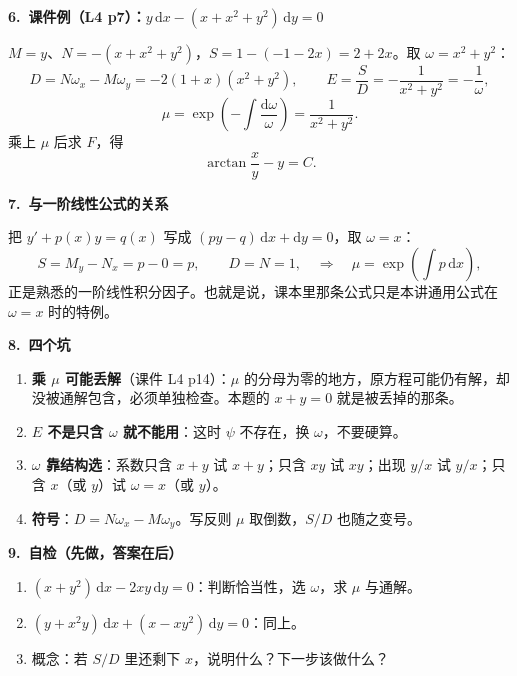 \documentclass[11pt,a4paper]{ctexart}
\newcommand{\dd}{\mathrm{d}}
\begin{document}
\textbf{6.\ 课件例（L4 p7）：$y\,\dd x-(x+x^{2}+y^{2})\,\dd y=0$}

$M=y$、$N=-(x+x^{2}+y^{2})$，$S=1-(-1-2x)=2+2x$。取 $\omega=x^{2}+y^{2}$：
\[
D=N\omega_x-M\omega_y=-2(1+x)(x^{2}+y^{2}),\qquad
E=\frac{S}{D}=-\frac{1}{x^{2}+y^{2}}=-\frac{1}{\omega},
\]
\[
\mu=\exp\!\left(-\int\frac{\dd\omega}{\omega}\right)=\frac{1}{x^{2}+y^{2}} .
\]
乘上 $\mu$ 后求 $F$，得
\[
\arctan\frac{x}{y}-y=C .
\]

\textbf{7.\ 与一阶线性公式的关系}

把 $y'+p(x)y=q(x)$ 写成 $(py-q)\,\dd x+\dd y=0$，取 $\omega=x$：
\[
S=M_y-N_x=p-0=p,\qquad D=N=1,
\quad\Longrightarrow\quad
\mu=\exp\!\left(\int p\,\dd x\right),
\]
正是熟悉的一阶线性积分因子。也就是说，课本里那条公式只是本讲通用公式在 $\omega=x$ 时的特例。

\textbf{8.\ 四个坑}

\begin{enumerate}
\item \textbf{乘 $\mu$ 可能丢解}（课件 L4 p14）：$\mu$ 的分母为零的地方，原方程可能仍有解，却没被通解包含，必须单独检查。本题的 $x+y=0$ 就是被丢掉的那条。
\item \textbf{$E$ 不是只含 $\omega$ 就不能用}：这时 $\psi$ 不存在，换 $\omega$，不要硬算。
\item \textbf{$\omega$ 靠结构选}：系数只含 $x+y$ 试 $x+y$；只含 $xy$ 试 $xy$；出现 $y/x$ 试 $y/x$；只含 $x$（或 $y$）试 $\omega=x$（或 $y$）。
\item \textbf{符号}：$D=N\omega_x-M\omega_y$。写反则 $\mu$ 取倒数，$S/D$ 也随之变号。
\end{enumerate}

\textbf{9.\ 自检（先做，答案在后）}

\begin{enumerate}
\item $(x+y^{2})\,\dd x-2xy\,\dd y=0$：判断恰当性，选 $\omega$，求 $\mu$ 与通解。
\item $(y+x^{2}y)\,\dd x+(x-xy^{2})\,\dd y=0$：同上。
\item 概念：若 $S/D$ 里还剩下 $x$，说明什么？下一步该做什么？
\end{enumerate}
\end{document}
